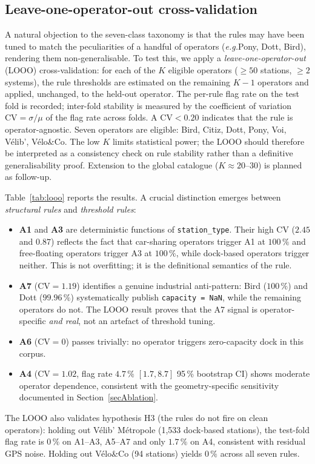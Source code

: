 \documentclass[11pt,a4paper]{article}
\newcommand{\eg}{\emph{e.g.}}
\begin{document}
\subsection{Leave-one-operator-out cross-validation}\label{secLOOO}
A natural objection to the seven-class taxonomy is that the rules
may have been tuned to match the peculiarities of a handful of
operators (\eg Pony, Dott, Bird), rendering them non-generalisable.
To test this, we apply a \emph{leave-one-operator-out} (LOOO)
cross-validation: for each of the $K$ eligible operators
($\ge 50$ stations, $\ge 2$ systems), the rule thresholds are
estimated on the remaining $K-1$ operators and applied, unchanged,
to the held-out operator. The per-rule flag rate on the test fold
is recorded; inter-fold stability is measured by the coefficient of
variation $\mathrm{CV} = \sigma / \mu$ of the flag rate across folds.
A $\mathrm{CV} < 0.20$ indicates that the rule is operator-agnostic.
Seven operators are eligible: Bird, Citiz, Dott, Pony, Voi, V\'elib',
V\'elo\&Co. The low $K$ limits statistical power; the LOOO should
therefore be interpreted as a consistency check on rule stability
rather than a definitive generalisability proof. Extension to the
global catalogue ($K \approx 20$--$30$) is planned as follow-up.

Table~\ref{tab:looo} reports the results. A crucial distinction
emerges between \emph{structural rules} and \emph{threshold rules}:
%
\begin{itemize}[nosep]
\item \textbf{A1} and \textbf{A3} are deterministic functions of
  \texttt{station\_type}. Their high CV ($2.45$ and $0.87$) reflects
  the fact that car-sharing operators trigger A1 at $100\,\%$ and
  free-floating operators trigger A3 at $100\,\%$, while dock-based
  operators trigger neither. This is not overfitting; it is the
  definitional semantics of the rule.
\item \textbf{A7} ($\mathrm{CV} = 1.19$) identifies a genuine
  industrial anti-pattern: Bird ($100\,\%$) and Dott ($99.96\,\%$)
  systematically publish \texttt{capacity = NaN}, while the
  remaining operators do not. The LOOO result proves that the A7
  signal is operator-specific \emph{and real}, not an artefact of
  threshold tuning.
\item \textbf{A6} ($\mathrm{CV} = 0$) passes trivially: no
  operator triggers zero-capacity dock in this corpus.
\item \textbf{A4} ($\mathrm{CV} = 1.02$, flag rate
  $4.7\,\%$ $[1.7, 8.7]$ 95\,\% bootstrap CI) shows moderate
  operator dependence, consistent with the geometry-specific
  sensitivity documented in Section~\ref{secAblation}.
\end{itemize}
%
The LOOO also validates hypothesis H3 (the rules do not fire on
clean operators): holding out V\'elib' M\'etropole (1{,}533
dock-based stations), the test-fold flag rate is $0\,\%$ on A1--A3,
A5--A7 and only $1.7\,\%$ on A4, consistent with residual GPS noise.
Holding out V\'elo\&Co (94 stations) yields $0\,\%$ across all
seven rules.
\end{document}
